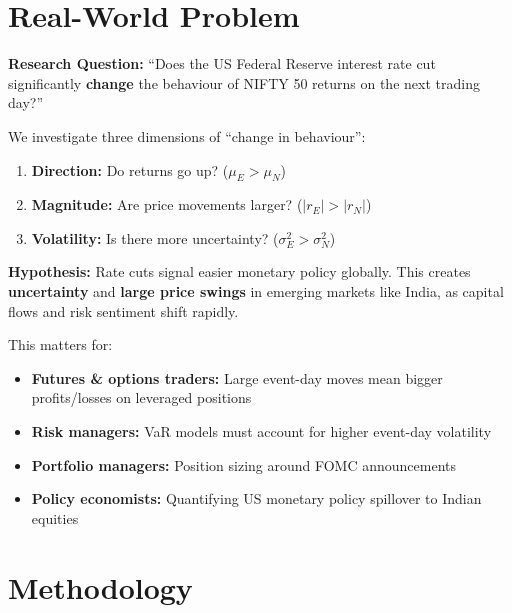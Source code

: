 \documentclass[12pt,a4paper]{article}
\begin{document}
\newpage
\section{Real-World Problem}

\textbf{Research Question:} ``Does the US Federal Reserve interest rate cut significantly \textbf{change} the behaviour of NIFTY 50 returns on the next trading day?''

We investigate three dimensions of ``change in behaviour'':
\begin{enumerate}
    \item \textbf{Direction:} Do returns go up? ($\mu_E > \mu_N$)
    \item \textbf{Magnitude:} Are price movements larger? ($|r_E| > |r_N|$)
    \item \textbf{Volatility:} Is there more uncertainty? ($\sigma^2_E > \sigma^2_N$)
\end{enumerate}

\textbf{Hypothesis:} Rate cuts signal easier monetary policy globally. This creates \textbf{uncertainty} and \textbf{large price swings} in emerging markets like India, as capital flows and risk sentiment shift rapidly.

This matters for:
\begin{itemize}
    \item \textbf{Futures \& options traders:} Large event-day moves mean bigger profits/losses on leveraged positions
    \item \textbf{Risk managers:} VaR models must account for higher event-day volatility
    \item \textbf{Portfolio managers:} Position sizing around FOMC announcements
    \item \textbf{Policy economists:} Quantifying US monetary policy spillover to Indian equities
\end{itemize}

\section{Methodology}
\end{document}
